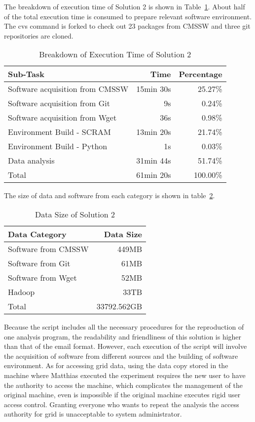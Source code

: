 \documentclass{acm_proc_article-sp}
\begin{document}
The breakdown of execution time of Solution 2 is shown in Table~\ref{table:time-2nd}. About half of the total execution time is consumed to prepare relevant software environment. The cvs command is forked to check out 23 packages from CMSSW and three git repositories are cloned.

\begin{table}
    \centering
    \begin{tabular}{|l|r|r|}
    \hline
    Sub-Task & Time & Percentage \\ \hline
    Software acquisition from CMSSW & 15min 30s & 25.27\% \\ \hline
    Software acquisition from Git & 9s & 0.24\% \\ \hline
    Software acquisition from Wget & 36s & 0.98\% \\ \hline
    Environment Build - SCRAM & 13min 20s & 21.74\% \\ \hline
    Environment Build - Python & 1s & 0.03\% \\ \hline
    Data analysis & 31min 44s & 51.74\% \\ \hline
    Total & 61min 20s & 100.00\% \\ \hline
    \end{tabular}
    \caption{Breakdown of Execution Time of Solution 2}
    \label{table:time-2nd}
\end{table}

The size of data and software from each category is shown in table~\ref{table:datasize-2nd}.

\begin{table}
    \centering
    \begin{tabular}{|l|r|}
    \hline
    Data Category & Data Size \\ \hline
    Software from CMSSW & 449MB \\ \hline
    Software from Git & 61MB \\ \hline
    Software from Wget & 52MB \\ \hline
    Hadoop & 33TB \\ \hline
    Total & 33792.562GB \\ \hline
    \end{tabular}
    \caption{Data Size of Solution 2}
    \label{table:datasize-2nd}
\end{table}

Because the script includes all the necessary procedures for the reproduction of one analysis program, the readability and friendliness of this solution is higher than that of the email format. However, each execution of the script will involve the acquisition of software from different sources and the building of software environment. As for accessing grid data, using the data copy stored in the machine where Matthias executed the experiment requires the new user to have the authority to access the machine, which complicates the management of the original machine, even is impossible if the original machine executes rigid user access control. Granting everyone who wants to repeat the analysis the access authority for grid is unacceptable to system administrator. 
\end{document}
